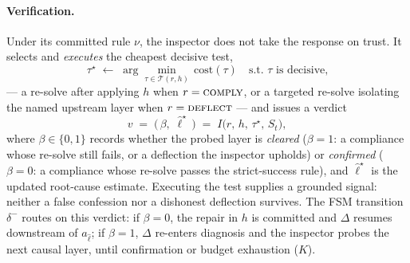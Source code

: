 \documentclass[a4paper,fleqn]{cas-sc}
\begin{document}
\paragraph{Verification.}
\label{sec:leader_follower}
Under its committed rule $\nu$, the inspector does not take the response on
trust. It selects and \emph{executes} the cheapest decisive test,
\begin{equation}\label{eq:follower}
\tau^{\star} \;\gets\; \arg\min_{\tau\in\mathcal{T}(r,h)}\,
      \mathrm{cost}(\tau)\quad\text{s.t.\ $\tau$ is decisive,}
\end{equation}
--- a re-solve after applying $h$ when $r=\textsc{comply}$, or a targeted
re-solve isolating the named upstream layer when $r=\textsc{deflect}$ --- and
issues a verdict
\begin{equation}\label{eq:verdict}
v \;=\; \bigl(\,\beta,\;\hat{\ell}^{\star}\,\bigr)
\;=\; I\!\bigl(r,\,h,\,\tau^{\star},\,S_t\bigr),
\end{equation}
where $\beta\in\{0,1\}$ records whether the probed layer is \emph{cleared}
($\beta{=}1$: a compliance whose re-solve still fails, or a deflection the
inspector upholds) or \emph{confirmed} ($\beta{=}0$: a compliance whose
re-solve passes the strict-success rule), and $\hat{\ell}^{\star}$ is the
updated root-cause estimate. Executing the test supplies a grounded signal:
neither a false confession nor a dishonest deflection survives. The FSM
transition $\delta^{-}$ routes on this verdict: if $\beta=0$, the repair in
$h$ is committed and $\Delta$ resumes downstream of $a_{\hat{\ell}}$; if
$\beta=1$, $\Delta$ re-enters diagnosis and the inspector probes the next
causal layer, until confirmation or budget exhaustion ($K$).
\end{document}
